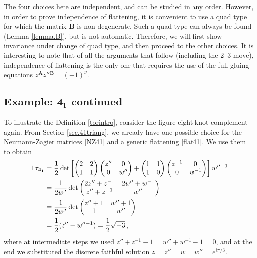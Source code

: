 \documentclass[12pt]{amsart}
\newcommand{\lbl}{\label}
\renewcommand{\eta}{\nu}
\theoremstyle{definition}
\newcommand{\mb}{\mathbf}
\numberwithin{equation}{section}
\begin{document}
The four choices here are independent, and can be studied in any order. However, in order to prove independence of flattening, it is convenient to use a quad type for which the matrix $\mb B$ is non-degenerate. Such a quad type can always be found (Lemma \ref{lemma.B}), but is not automatic. Therefore, we will first show invariance under change of quad type, and then proceed to the other choices. It is interesting to note that of all the arguments that follow (including the 2--3 move), independence of flattening is the only one that requires the use of the full gluing equations $z^{\mb A}z''{}^{\mb B}=(-1)^\eta$.



\subsection{Example: $\mb{4_1}$ continued}
\lbl{sub.torexample}

To illustrate the Definition \ref{torintro}, consider the figure-eight knot 
complement again. From Section \ref{sec.41triang}, we already have one 
possible choice for the Neumann-Zagier matrices \eqref{NZ41} and a 
generic flattening \eqref{flat41}. We use them to obtain
%
\begin{align}
\pm\tau_{\mb{4_1}} &= \frac12 \det\left[\begin{pmatrix} 2 & 2 \\ 1 & 1 
\end{pmatrix}\begin{pmatrix} z'' & 0 \\ 0 & w'' \end{pmatrix} 
+ \begin{pmatrix} 1 & 1 \\ 1 & 0 \end{pmatrix}\begin{pmatrix} z^{-1} & 0 
\\ 0 & w^{-1} \end{pmatrix}\right] w''{}^{-1} \notag \\
&= \frac1{2w''}\det\begin{pmatrix} 2z''+z^{-1} & 2w''+w^{-1}
\\ z''+z^{-1} & w'' \end{pmatrix} \notag \\
&= \frac1{2w''}\det\begin{pmatrix} z''+1 & w''+1\\ 1 & w'' 
\end{pmatrix} \notag\\ 
&=\frac12(z''-w''{}^{-1}) = \frac12{\sqrt{-3}}\,, \label{tor41}
\end{align}
%
where at intermediate steps we used $z''+z^{-1}-1=w''+w^{-1}-1=0$, and at the 
end we substituted the discrete faithful solution $z=z''=w=w''=e^{i\pi/3}$.
\end{document}
